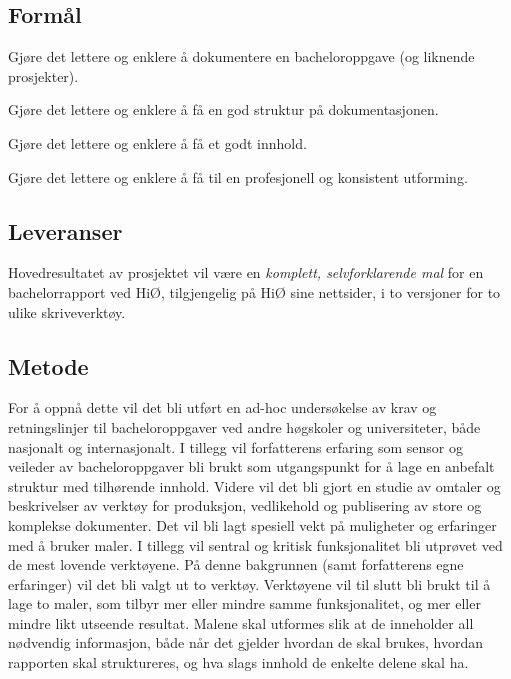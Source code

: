 \subsection{Formål}
\label{sec:maal}

\begin{compactenum}[{\bf Hovedmål}]
\item Gjøre det lettere og enklere å dokumentere en bacheloroppgave (og liknende prosjekter).
\begin{compactenum}[{\bf  Delmål} \bf 1]
\item Gjøre det lettere og enklere å få en god struktur på dokumentasjonen.
\item Gjøre det lettere og enklere å få et godt innhold.
\item Gjøre det lettere og enklere å få til en profesjonell og konsistent utforming.
\end{compactenum}
\end{compactenum}

\subsection{Leveranser}
\label{sec:resultater}
Hovedresultatet av prosjektet vil være en {\em komplett, selvforklarende mal} for en bachelorrapport ved HiØ, tilgjengelig på HiØ sine nettsider, i to versjoner for to ulike skriveverktøy.

\subsection{Metode}
\label{sec:metode}
For å oppnå dette vil det bli utført en ad-hoc undersøkelse av krav og retningslinjer til bacheloroppgaver ved andre høgskoler og universiteter, både nasjonalt og internasjonalt. I tillegg vil forfatterens erfaring som sensor og veileder av bacheloroppgaver bli brukt som utgangspunkt for å lage en anbefalt struktur med tilhørende innhold.
Videre vil det bli gjort en studie av omtaler og beskrivelser av verktøy for produksjon, vedlikehold og publisering av store og komplekse dokumenter. Det vil bli lagt spesiell vekt på muligheter og erfaringer med å bruker maler. I tillegg vil sentral og kritisk funksjonalitet bli utprøvet ved de mest lovende verktøyene. På denne bakgrunnen (samt forfatterens egne erfaringer) vil det bli valgt ut to verktøy. Verktøyene vil til slutt bli brukt til å lage to maler, som tilbyr mer eller mindre samme funksjonalitet, og mer eller mindre likt utseende resultat. Malene skal utformes slik at de inneholder all nødvendig informasjon, både når det gjelder hvordan de skal brukes, hvordan rapporten skal struktureres, og hva slags innhold de enkelte delene skal ha.

